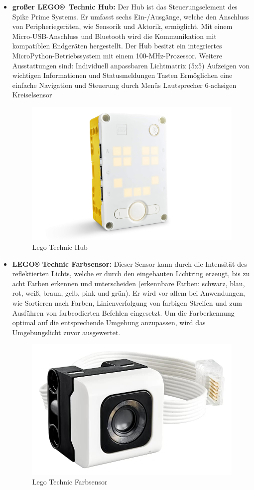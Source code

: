 \begin{itemize}
\item \textbf{großer LEGO® Technic Hub:}
Der Hub ist das Steuerungselement des Spike Prime Systems. Er umfasst sechs Ein-/Ausgänge, welche den Anschluss von Peripheriegeräten, wie Sensorik und Aktorik, ermöglicht. Mit einem Micro-USB-Anschluss und Bluetooth wird die Kommunikation mit kompatiblen Endgeräten hergestellt. Der Hub besitzt ein integriertes MicroPython-Betriebssystem mit einem 100-MHz-Prozessor. 
Weitere Ausstattungen sind:
Individuell anpassbaren Lichtmatrix (5x5)
Aufzeigen von wichtigen Informationen und Statusmeldungen
Tasten
Ermöglichen eine einfache Navigation und Steuerung durch Menüs 
Lautsprecher
6-achsigen Kreiselsensor

\begin{figure}[H]
	\centering
	\includegraphics[width=0.5\linewidth]{images/Hub}
	\caption{Lego Technic Hub}
	\label{fig:hub}
\end{figure}


\item \textbf{LEGO® Technic Farbsensor:}
Dieser Sensor kann durch die Intensität des reflektierten Lichts, welche er durch den eingebauten Lichtring erzeugt, bis zu acht Farben erkennen und unterscheiden (erkennbare Farben: schwarz, blau, rot, weiß, braun, gelb, pink und grün).  Er wird vor allem bei Anwendungen, wie Sortieren nach Farben, Linienverfolgung von farbigen Streifen und zum Ausführen von farbcodierten Befehlen eingesetzt. Um die Farberkennung optimal auf die entsprechende Umgebung anzupassen, wird das Umgebungslicht zuvor ausgewertet.

\begin{figure}[H]
	\centering
	\includegraphics[width=0.5\linewidth]{images/Farbsensor}
	\caption{Lego Technic Farbsensor}
	\label{fig:farbsensor}
\end{figure}



\end{itemize}
